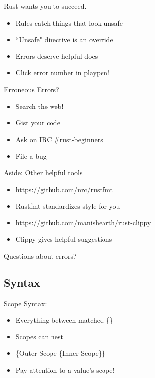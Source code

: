 \documentclass[100pt]{beamer}
\begin{document}
\begin{frame}
    Rust wants you to succeed.
    \begin{itemize}
        \item Rules catch things that look unsafe
        \item ``Unsafe" directive is an override
        \item Errors deserve helpful docs
        \item Click error number in playpen!
    \end{itemize}
\end{frame}

\begin{frame}
    Erroneous Errors?
    \begin{itemize}
        \item Search the web!
        \item Gist your code
        \item Ask on IRC \#rust-beginners
        \item File a bug
    \end{itemize}
\end{frame}

\begin{frame}
    Aside: Other helpful tools
    \begin{itemize}
        \item \url{https://github.com/nrc/rustfmt}
        \item Rustfmt standardizes style for you
        \item \url{https://github.com/manishearth/rust-clippy}
        \item Clippy gives helpful suggestions
    \end{itemize}
\end{frame}

\begin{frame}
    Questions about errors?
\end{frame}


\subsection{Syntax}

\begin{frame}
    Scope Syntax:
    \begin{itemize}
        \item Everything between matched \{\}
        \item Scopes can nest
        \item \{Outer Scope \{Inner Scope\}\}
        \item Pay attention to a value's scope!
    \end{itemize}
\end{frame}
\end{document}
